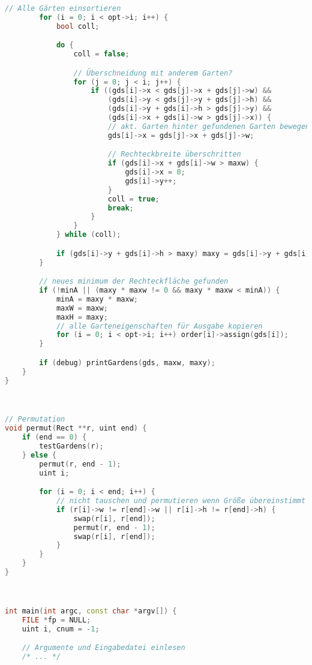 \documentclass[a4paper,10pt,ngerman]{scrartcl}
\begin{document}
\begin{lstlisting}[language=C++]
        // Alle Gärten einsortieren
        for (i = 0; i < opt->i; i++) {
            bool coll;

            do {
                coll = false;

                // Überschneidung mit anderem Garten?
                for (j = 0; j < i; j++) {
                    if ((gds[i]->x < gds[j]->x + gds[j]->w) &&
                        (gds[i]->y < gds[j]->y + gds[j]->h) &&
                        (gds[i]->y + gds[i]->h > gds[j]->y) &&
                        (gds[i]->x + gds[i]->w > gds[j]->x)) {
                        // akt. Garten hinter gefundenen Garten bewegen
                        gds[i]->x = gds[j]->x + gds[j]->w;

                        // Rechteckbreite überschritten
                        if (gds[i]->x + gds[i]->w > maxw) {
                            gds[i]->x = 0;
                            gds[i]->y++;
                        }
                        coll = true;
                        break;
                    }
                }
            } while (coll);

            if (gds[i]->y + gds[i]->h > maxy) maxy = gds[i]->y + gds[i]->h;
        }

        // neues minimum der Rechteckfläche gefunden
        if (!minA || (maxy * maxw != 0 && maxy * maxw < minA)) {
            minA = maxy * maxw;
            maxW = maxw;
            maxH = maxy;
            // alle Garteneigenschaften für Ausgabe kopieren
            for (i = 0; i < opt->i; i++) order[i]->assign(gds[i]);
        }

        if (debug) printGardens(gds, maxw, maxy);
    }
}



// Permutation
void permut(Rect **r, uint end) {
    if (end == 0) {
        testGardens(r);
    } else {
        permut(r, end - 1);
        uint i;

        for (i = 0; i < end; i++) {
            // nicht tauschen und permutieren wenn Größe übereinstimmt
            if (r[i]->w != r[end]->w || r[i]->h != r[end]->h) {
                swap(r[i], r[end]);
                permut(r, end - 1);
                swap(r[i], r[end]);
            }
        }
    }
}



int main(int argc, const char *argv[]) {
    FILE *fp = NULL;
    uint i, cnum = -1;

    // Argumente und Eingabedatei einlesen
    /* ... */


\end{lstlisting}
\end{document}
